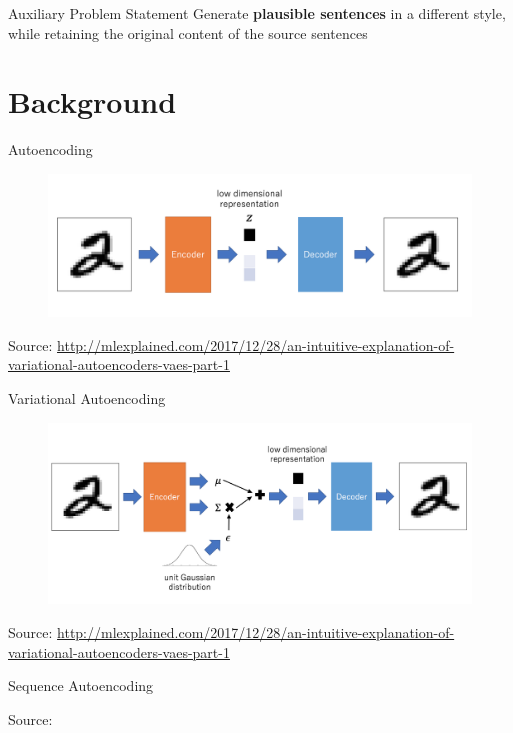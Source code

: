 \documentclass[aspectratio=169]{beamer}
\newcommand{\imgsrc}[1]{\tiny{Source: #1}}
\begin{document}
\begin{frame}{Auxiliary Problem Statement}
	\centering
	\Huge{Generate \textbf{plausible sentences} in a different style, while retaining the original content of the source sentences}
\end{frame}

% 

\section{Background}

\begin{frame}{Autoencoding}
	\centering
	\begin{figure}[ht]
		\includegraphics[width=\linewidth]{dae-structure}
	\end{figure}
	\imgsrc{\url{http://mlexplained.com/2017/12/28/an-intuitive-explanation-of-variational-autoencoders-vaes-part-1}}
\end{frame}

\begin{frame}{Variational Autoencoding}
	\centering
	\begin{figure}[ht]
		\includegraphics[width=\linewidth]{vae-structure}
	\end{figure}
	\imgsrc{\url{http://mlexplained.com/2017/12/28/an-intuitive-explanation-of-variational-autoencoders-vaes-part-1}}
\end{frame}

\begin{frame}{Sequence Autoencoding}
	\centering
	\begin{figure}[ht]
		
	\end{figure}
	\imgsrc{\citet{srivastava2015unsupervised}}
\end{frame}
\end{document}
